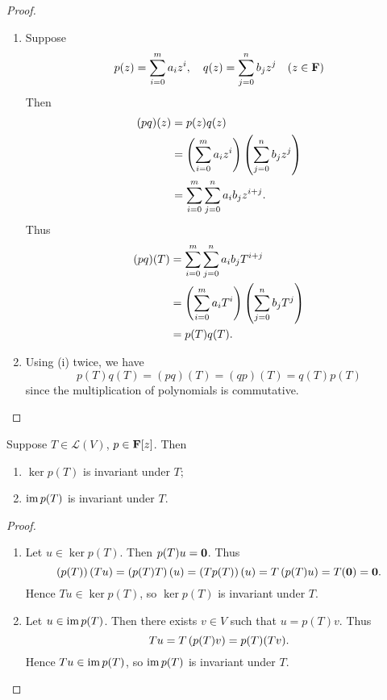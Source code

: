 \begin{proof} \
\begin{enumerate}[label=(\roman*)]
\item Suppose
\[p(z)=\sum_{i=0}^{m}a_iz^i,\quad q(z)=\sum_{j=0}^{n}b_jz^j\quad(z\in\mathbf F)\]
Then
\begin{align*}
(pq)(z)&=p(z)q(z)\\
&=\left(\sum_{i=0}^{m}a_iz^i\right)\left(\sum_{j=0}^{n}b_jz^j\right)\\
&=\sum_{i=0}^{m}\sum_{j=0}^{n}a_ib_jz^{i+j}.
\end{align*}
Thus
\begin{align*}
(pq)(T)&=\sum_{i=0}^{m}\sum_{j=0}^{n}a_ib_jT^{i+j}\\
&=\left(\sum_{i=0}^{m}a_iT^i\right)\left(\sum_{j=0}^{n}b_jT^j\right)\\
&=p(T)q(T).
\end{align*}

\item Using (i) twice, we have
\[p(T)q(T)=(pq)(T)=(qp)(T)=q(T)p(T)\]
since the multiplication of polynomials is commutative.
\end{enumerate}
\end{proof}

\begin{lemma}\label{lemma:ker-im-polynomial-invariant}
Suppose $T\in\mathcal{L}(V)$, $p\in\mathbf F[z]$. Then
\begin{enumerate}[label=(\roman*)]
\item $\ker p(T)$ is invariant under $T$;
\item $\operatorname{im} p(T)$ is invariant under $T$.
\end{enumerate}
\end{lemma}

\begin{proof} \

\begin{enumerate}[label=(\roman*)]
\item Let $u\in\ker p(T)$. Then $p(T)u=\vb{0}$. Thus
\[\left(p(T)\right)(Tu)=\left(p(T)T\right)(u)=\left(Tp(T)\right)(u)=T\left(p(T)u\right)=T(\vb{0})=\vb{0}.\]
Hence $Tu\in\ker p(T)$, so $\ker p(T)$ is invariant under $T$.

\item Let $u\in\operatorname{im} p(T)$. Then there exists $v\in V$ such that $u=p(T)v$. Thus
\[Tu=T\left(p(T)v\right)=p(T)(Tv).\]
Hence $Tu\in\operatorname{im} p(T)$, so $\operatorname{im} p(T)$ is invariant under $T$.
\end{enumerate}
\end{proof}
\pagebreak

